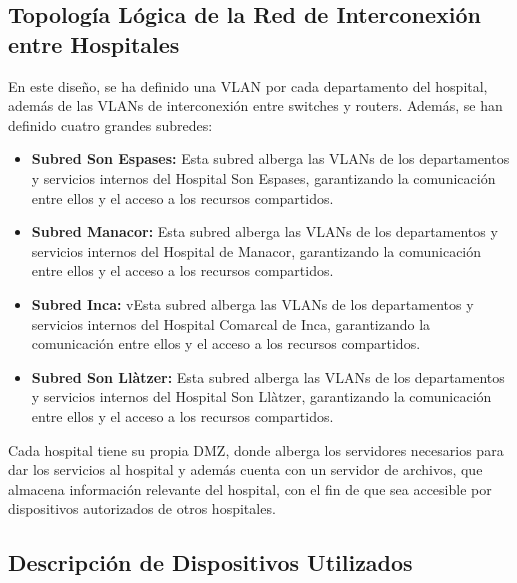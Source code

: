 \subsection{Topología Lógica de la Red de Interconexión entre Hospitales}
En este diseño, se ha definido una VLAN por cada departamento del hospital, además de las VLANs de interconexión entre switches y routers. Además, se han definido cuatro grandes subredes:
\begin{itemize}
    \item \textbf{Subred Son Espases:} Esta subred alberga las VLANs de los departamentos y servicios internos del Hospital Son Espases, garantizando la comunicación entre ellos y el acceso a los recursos compartidos.
    \item \textbf{Subred Manacor:} Esta subred alberga las VLANs de los departamentos y servicios internos del Hospital de Manacor, garantizando la comunicación entre ellos y el acceso a los recursos compartidos.
    \item \textbf{Subred Inca:} vEsta subred alberga las VLANs de los departamentos y servicios internos del Hospital Comarcal de Inca, garantizando la comunicación entre ellos y el acceso a los recursos compartidos.
    \item \textbf{Subred Son Llàtzer:} Esta subred alberga las VLANs de los departamentos y servicios internos del Hospital Son Llàtzer, garantizando la comunicación entre ellos y el acceso a los recursos compartidos.
\end{itemize}
Cada hospital tiene su propia DMZ, donde alberga los servidores necesarios para dar los servicios al hospital y además cuenta con un servidor de archivos, que almacena información relevante del hospital, con el fin de que sea accesible por dispositivos autorizados de otros hospitales.

\subsection{Descripción de Dispositivos Utilizados}

